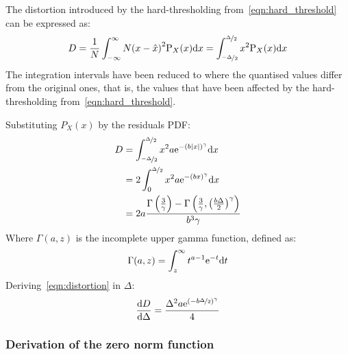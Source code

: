 \documentclass[11pt,a4paper,openright,twoside]{book}
\numberwithin{equation}{section} %
\numberwithin{figure}{section} %
\numberwithin{table}{section} %
\begin{document}
The distortion introduced by the hard-thresholding
from~\eqref{eqn:hard_threshold} can be expressed as:
\begin{equation}
	D
	= \frac{1}{N} \int_{-\infty}^{\infty} N {(x - \hat x)}^2 \text{P}_X (x)\text{d} x
	= \int_{\nicefrac{-\Delta}{2}}^{\nicefrac{\Delta}{2}}
	\label{eqn:int_distortion}
	x^2\text{P}_X (x) \text{d} x
\end{equation}
The integration intervals have been reduced to where the quantised values
differ from the original ones, that is, the values that have been affected by
the hard-thresholding from~\eqref{eqn:hard_threshold}.

Substituting $P_X(x)$ by the residuals \ac{PDF}:
\begin{align}
	D
	&=\int_{\nicefrac{-\Delta}{2}}^{\nicefrac{\Delta}{2}}
	x^2 a \text{e}^{-{\left(b\vert x \vert\right)}^\gamma} \text{d} x \\
	&=2 \int_0^{\nicefrac{\Delta}{2}}
	x^2 a \text{e}^{-{\left(b x \right)}^\gamma} \text{d} x\\
	&=
		2a \frac{\Gamma\left(\frac{3}{\gamma}\right)-
		\Gamma\left(
		\frac{3}{\gamma},{\left(\frac{b\Delta}{2}\right)}^\gamma
		\right)}{b^3\gamma}
	\label{eqn:distortion}
\end{align}
Where $\Gamma(a,z)$ is the incomplete upper gamma function, defined as:
\begin{equation}
	\Gamma(a,z)=\int_z^\infty t^{a-1}\text{e}^{-t}\text{d} t
\end{equation}
Deriving~\eqref{eqn:distortion} in $\Delta$:
\begin{equation}
	\frac{\text{d} D}{\text{d}\Delta} =
	\frac{\Delta^2 a \text{e}^{{(-b\nicefrac{\Delta}{2})}^\gamma}}{4}
	\label{eqn:diff_distortion}
\end{equation}

\subsubsection{Derivation of the zero norm function}
\label{ssub:derivation_of_the_zero_norm_function}
\end{document}
